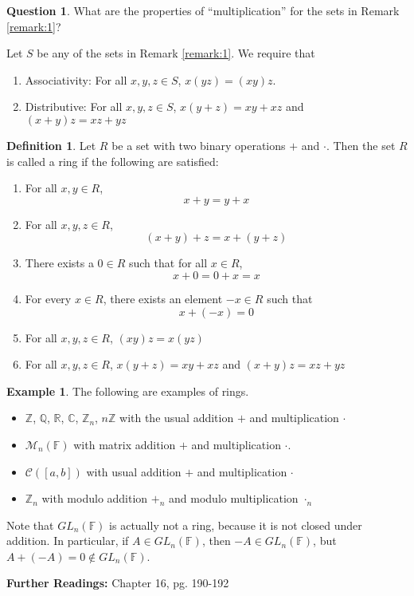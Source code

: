 \documentclass[11pt]{amsart}
\theoremstyle{definition}\newtheorem{definition}{Definition}
\theoremstyle{definition}\newtheorem{example}{Example}
\theoremstyle{theorem}\newtheorem{theorem}{Theorem}
\theoremstyle{theorem}\newtheorem{corollary}{Corollary}
\theoremstyle{theorem}\newtheorem{proposition}{Proposition}
\theoremstyle{theorem}\newtheorem{lemma}{Lemma}
\theoremstyle{theorem}\newtheorem{question}{Question}
\theoremstyle{remark}\newtheorem{remark}{Remark}
\newcommand{\C}{\mathbb{C}}
\newcommand{\CC}{\mathcal{C}}
\newcommand{\R}{\mathbb{R}}
\newcommand{\Q}{\mathbb{Q}}
\newcommand{\Z}{\mathbb{Z}}
\newcommand{\F}{\mathbb{F}}
\newcommand{\M}{\mathcal{M}}
\begin{document}
\begin{question}\label{question:1}
    What are the properties of ``multiplication'' for the sets in Remark \ref{remark:1}?
\end{question}

Let $S$ be any of the sets in Remark \ref{remark:1}. We require that
\begin{enumerate}
    \item Associativity: For all $x, y, z \in S$, $x(yz) = (xy)z$.
    \item Distributive: For all $x, y, z \in S$, $x(y + z) = xy + xz$ and $(x + y)z = xz + yz$
\end{enumerate}

\begin{definition}\label{definition:3}
    Let $R$ be a set with two binary operations $+$ and $\cdot$. Then the set $R$ is called a ring if the following are satisfied:
    \begin{enumerate}
        \item For all $x, y \in R$, $$x + y = y + x$$
        \item For all $x, y, z \in R$, $$(x + y) + z = x + (y + z)$$
        \item There exists a $0 \in R$ such that for all $x \in R$, $$x + 0 = 0 + x = x$$
        \item For every $x \in R$, there exists an element $-x \in R$ such that $$x + (-x) = 0$$
        \item For all $x, y, z \in R$, $(xy)z = x(yz)$
        \item For all $x, y, z \in R$, $x(y + z) = xy + xz$ and $(x + y)z = xz + yz$
    \end{enumerate}
\end{definition}

\begin{example}\label{example:2}
    The following are examples of rings.
    \begin{itemize}
        \item $\Z$, $\Q$, $\R$, $\C$, $\Z_n$, $n\Z$ with the usual addition $+$ and multiplication $\cdot$
        \item $\M_n(\F)$ with matrix addition $+$ and multiplication $\cdot$.
        \item $\CC([a, b])$ with usual addition $+$ and multiplication $\cdot$
        \item $\Z_n$ with modulo addition $+_n$ and modulo multiplication $\cdot_n$
    \end{itemize}
\end{example}

Note that $GL_n(\F)$ is actually not a ring, because it is not closed under addition. In particular, if $A \in GL_n(\F)$, then $-A \in GL_n(\F)$, but $A + (-A) = 0 \notin GL_n(\F)$.

\noindent \textbf{Further Readings:} Chapter 16, pg. 190-192
\end{document}
